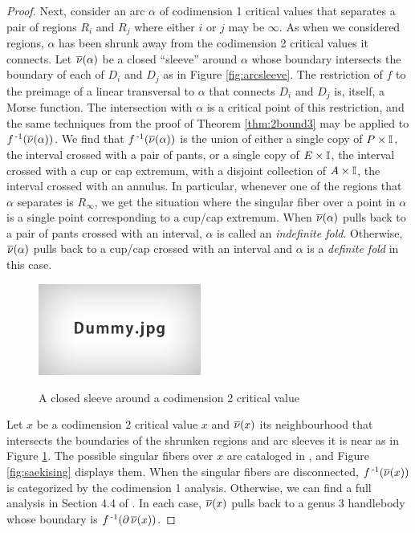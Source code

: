 \begin{proof}
	Next, consider an arc $\alpha$ of codimension 1 critical values that separates a pair of regions $R_i$ and $R_j$ where either $i$ or $j$ may be $\infty$.
	As when we considered regions, $\alpha$ has been shrunk away from the codimension 2 critical values it connects.
	Let $\overline{\nu}(\alpha)$ be a closed ``sleeve'' around $\alpha$ whose boundary intersects the boundary of each of $D_i$ and $D_j$ as in Figure \ref{fig:arcsleeve}.
	The restriction of $f$ to the preimage of a linear transversal to $\alpha$ that connects $D_i$ and $D_j$ is, itself, a Morse function.
	The intersection with $\alpha$ is a critical point of this restriction, and the same techniques from the proof of Theorem \ref{thm:2bound3} may be applied to $f^{\,\text{-}1}(\overline{\nu}(\alpha))$.
	We find that $f^{\,\text{-}1}(\overline{\nu}(\alpha))$ is the union of either a single copy of $P\times\mathbb{I}$, the interval crossed with a pair of pants, or a single copy of $E\times\mathbb{I}$, the interval crossed with a cup or cap extremum, with a disjoint collection of $A\times\mathbb{I}$, the interval crossed with an annulus.
	In particular, whenever one of the regions that $\alpha$ separates is $R_\infty$, we get the situation where the singular fiber over a point in $\alpha$ is a single point corresponding to a cup/cap extremum.
	When $\overline{\nu}(\alpha)$ pulls back to a pair of pants crossed with an interval, $\alpha$ is called an \emph{indefinite fold}.
	Otherwise, $\overline{\nu}(\alpha)$ pulls back to a cup/cap crossed with an interval and $\alpha$ is a \emph{definite fold} in this case.
	
	\begin{figure}
		\centering
		\caption{A closed sleeve around a codimension 2 critical value}
		\includegraphics[height=3cm]{figures/dummy.jpg}
		\label{fig:isolatesleeve}
	\end{figure}
	
	Let $x$ be a codimension 2 critical value $x$ and $\overline{\nu}(x)$ its neighbourhood that intersects the boundaries of the shrunken regions and arc sleeves it is near as in Figure \ref{fig:isolatesleeve}.
	The possible singular fibers over $x$ are cataloged in \cite{Saeki}, and Figure \ref{fig:saekising} displays them.
	When the singular fibers are disconnected, $f^{\,\text{-}1}(\overline{\nu}(x))$ is categorized by the codimension 1 analysis.
	Otherwise, we can find a full analysis in Section 4.4 of \cite{CostThur08}.
	In each case, $\overline{\nu}(x)$ pulls back to a genus 3 handlebody whose boundary is $f^{\,\text{-}1}(\partial\,\overline{\nu}(x))$.
	

\end{proof}
